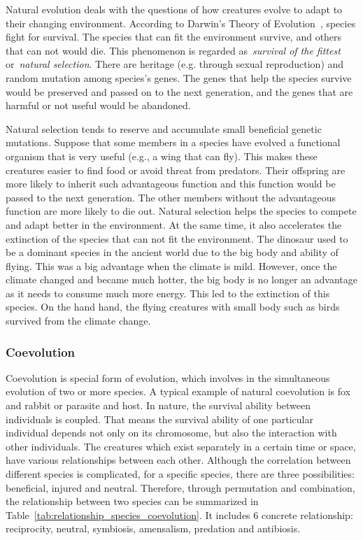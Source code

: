 Natural evolution deals with the questions of how creatures evolve to adapt to their changing environment. According to Darwin's Theory of Evolution~\cite{Darwin_1859}, species fight for survival. The species that can fit the environment survive, and others that can not would die. This phenomenon is regarded as~\textit{survival of the fittest} or~\textit{natural selection}. There are heritage (e.g. through sexual reproduction) and random mutation among species's genes. The genes that help the species survive would be preserved and passed on to the next generation, and the genes that are harmful or not useful would be abandoned. %

Natural selection tends to reserve and accumulate small beneficial genetic mutations. Suppose that some members in a species have evolved a functional organism that is very useful (e.g., a wing that can fly). This makes these creatures easier to find food or avoid threat from predators. Their offspring are more likely to inherit such advantageous function and this function would be passed to the next generation. The other members without the advantageous function are more likely to die out. Natural selection helps the species to compete and adapt better in the environment. At the same time, it also accelerates the extinction of the species that can not fit the environment. The dinosaur used to be a dominant species in the ancient world due to the big body and ability of flying. This was a big advantage when the climate is mild. However, once the climate changed and became much hotter, the big body is no longer an advantage as it needs to consume much more energy. This led to the extinction of this species. On the hand hand, the flying creatures with small body such as birds survived from the climate change. 

\subsubsection{Coevolution}

Coevolution is special form of evolution, which involves in the simultaneous evolution of two or more species. A typical example of natural coevolution is fox and rabbit or parasite and host. In nature, the survival ability between individuals is coupled. That means the survival ability of one particular individual depends not only on its chromosome, but also the interaction with other individuals. The creatures which exist separately in a certain time or space, have various relationships between each other. Although the correlation between different species is complicated, for a specific species, there are three possibilities: beneficial, injured and neutral. Therefore, through permutation and combination, the relationship between two species can be summarized in Table~\ref{tab:relationship_species_coevolution}. It includes 6 concrete relationship: reciprocity, neutral, symbiosis, amensalism, predation and antibiosis.

